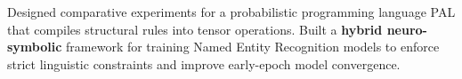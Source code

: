     \vspace{0.10 cm}
    \begin{onecolentry}
        \begin{highlights}
    
    \item Designed comparative experiments for a probabilistic programming language PAL that compiles structural rules into tensor operations. Built a \textbf{hybrid neuro-symbolic} framework for training Named Entity Recognition models to enforce strict linguistic constraints and improve early-epoch model convergence.

        
        \end{highlights}
    \end{onecolentry}
